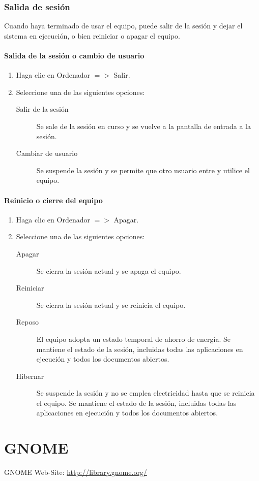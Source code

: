 \documentclass[12pt,letterpaper]{book}
\begin{document}
\section{Salida de sesión}
Cuando haya terminado de usar el equipo, puede salir de la sesión y dejar el sistema en ejecución, o bien reiniciar o apagar el equipo.\\
\subsection{Salida de la sesión o cambio de usuario}
\begin{enumerate}
\item Haga clic en Ordenador $=>$ Salir.
\item Seleccione una de las siguientes opciones:
\begin{description}
\item[Salir de la sesión] Se sale de la sesión en curso y se vuelve a la pantalla de entrada a la sesión.
\item[Cambiar de usuario] Se suspende la sesión y se permite que otro usuario entre y utilice el equipo.
\end{description}
\end{enumerate}
\subsection{Reinicio o cierre del equipo}
\begin{enumerate}
\item Haga clic en Ordenador $=>$ Apagar. 
\item Seleccione una de las siguientes opciones:
\begin{description}
\item[Apagar] Se cierra la sesión actual y se apaga el equipo.
\item[Reiniciar] Se cierra la sesión actual y se reinicia el equipo.
\item[Reposo] El equipo adopta un estado temporal de ahorro de energía. Se mantiene el estado de la sesión, incluidas todas las aplicaciones en ejecución y todos los documentos abiertos.
\item[Hibernar] Se suspende la sesión y no se emplea electricidad hasta que se reinicia el equipo. Se mantiene el estado de la sesión, incluidas todas las aplicaciones en ejecución y todos los documentos abiertos.
\end{description}
\end{enumerate}
\part{GNOME}






\begin{thebibliography}{5}
 GNOME Web-Site: \url{http://library.gnome.org/}
\end{thebibliography}
\end{document}
